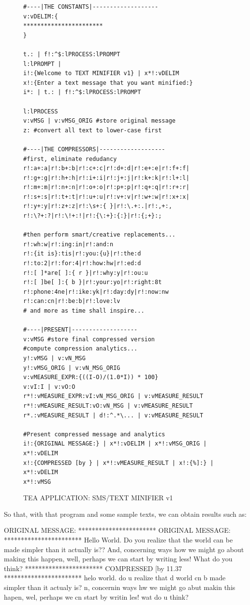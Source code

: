 \documentclass[a4paper, 18pt]{book} %
\begin{document}
{{{\begin{figure}[H]
\begin{tcolorbox}[teaterminalstyle, title=TEA Program:  TEXT MINIFIER v1]
\begin{lstlisting}[language=TEA,breaklines=true,]
#----|THE CONSTANTS|-------------------
v:vDELIM:{
***********************
}

t.: | f!:^$:lPROCESS:lPROMPT
l:lPROMPT | 
i!:{Welcome to TEXT MINIFIER v1} | x*!:vDELIM 
x!:{Enter a text message that you want minified:}
i*: | t.: | f!:^$:lPROCESS:lPROMPT

l:lPROCESS
v:vMSG | v:vMSG_ORIG #store original message
z: #convert all text to lower-case first

#----|THE COMPRESSORS|-------------------
#first, eliminate redudancy
r!:a+:a|r!:b+:b|r!:c+:c|r!:d+:d|r!:e+:e|r!:f+:f|
r!:g+:g|r!:h+:h|r!:i+:i|r!:j+:j|r!:k+:k|r!:l+:l|
r!:m+:m|r!:n+:n|r!:o+:o|r!:p+:p|r!:q+:q|r!:r+:r|
r!:s+:s|r!:t+:t|r!:u+:u|r!:v+:v|r!:w+:w|r!:x+:x|
r!:y+:y|r!:z+:z|r!:\s+:{ }|r!:\.+:.|r!:,+:,
r!:\?+:?|r!:\!+:!|r!:{\:+}:{:}|r!:{;+}:;

#then perform smart/creative replacements...
r!:wh:w|r!:ing:in|r!:and:n
r!:{it is}:tis|r!:you:{u}|r!:the:d
r!:to:2|r!:for:4|r!:how:hw|r!:ed:d
r!:[ ]*are[ ]:{ r }|r!:why:y|r!:ou:u
r!:[ ]be[ ]:{ b }|r!:your:yo|r!:right:8t
r!:phone:4ne|r!:ike:yk|r!:day:dy|r!:now:nw
r!:can:cn|r!:be:b|r!:love:lv
# and more as time shall inspire...

#----|PRESENT|-------------------
v:vMSG #store final compressed version
#compute compression analytics...
y!:vMSG | v:vN_MSG
y!:vMSG_ORIG | v:vN_MSG_ORIG
v:vMEASURE_EXPR:{((I-O)/(1.0*I)) * 100}
v:vI:I | v:vO:O
r*!:vMEASURE_EXPR:vI:vN_MSG_ORIG | v:vMEASURE_RESULT
r*!:vMEASURE_RESULT:vO:vN_MSG | v:vMEASURE_RESULT
r*.:vMEASURE_RESULT | d!:^.*\... | v:vMEASURE_RESULT

#Present compressed message and analytics
i!:{ORIGINAL MESSAGE:} | x*!:vDELIM | x*!:vMSG_ORIG | x*!:vDELIM 
x!:{COMPRESSED [by } | x*!:vMEASURE_RESULT | x!:{%]:} | x*!:vDELIM 
x*!:vMSG
   \end{lstlisting}
  \end{tcolorbox}
  \caption{TEA APPLICATION: SMS/TEXT MINIFIER v1}
  \label{FIGR1}
\end{figure}


\vspace{2em}


So that, with that program and some sample texts, we can obtain results such as:


   \begin{tcbverbatim}[title=Sample OUTPUT 1 from TEXT MINIFIER]
ORIGINAL MESSAGE:
***********************
ORIGINAL MESSAGE:
***********************
Hello  World. Do you realize that the world can be made simpler than it actually is?? And, concerning ways how we might go about making this happen, well, perhaps we can start by writing less! What do you think?
***********************
COMPRESSED [by 11.37%
***********************
helo world. do u realize that d world cn b made simpler than it actualy is? n, concernin ways hw we might go abut makin this hapen, wel, perhaps we cn start by writin les! wat do u think?
  \end{tcbverbatim}
  
}}}
\end{document}
